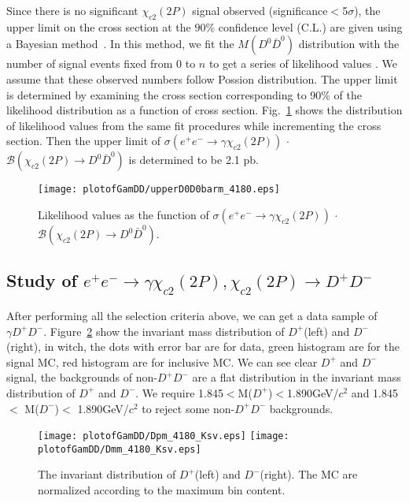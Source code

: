 \documentclass[aps,preprint,tightenlines,superscriptaddress,showpacs,byrevtex,amsmath,amssymb,nofloatfix]{revtex4}
\begin{document}
  Since there is no significant $\chi_{c2}(2P)$ signal observed (significance$<$5$\sigma$), the upper limit on the cross section at the $90\%$ confidence level (C.L.) are given using a Bayesian method~\cite{upperlimit}. In this method, we fit the $M(D^{0}\bar{D}^{0})$ distribution with the number of signal events fixed from 0 to $n$ to get a series of likelihood values . We assume that these observed numbers follow Possion distribution.  The upper limit is determined by examining the cross section corresponding to 90\% of the likelihood distribution as a function of cross section. Fig.~\ref{FitDDbar_D0_up} shows the distribution of likelihood values from the same fit procedures while incrementing the cross section. Then the upper limit of $\sigma (e^{+}e^{-}\rightarrow \gamma \chi_{c2} (2P))$ $\cdot$ $\mathcal{B}(\chi_{c2} (2P)\rightarrow  D^{0}\bar{D}^{0})$ is determined to be 2.1 pb.

\begin{figure}[!htbp]
\captionsetup{justification=raggedright}
    \texttt{[image: plotofGamDD/upperD0D0barm\_4180.eps]}

  \caption{\small Likelihood values as the function of $\sigma (e^{+}e^{-}\rightarrow \gamma \chi_{c2} (2P))$ $\cdot$ $\mathcal{B}(\chi_{c2} (2P)\rightarrow  D^{0}\bar{D}^{0})$.}
  \label{FitDDbar_D0_up}
\end{figure}



\subsection{Study of $e^{+}e^{-}\rightarrow \gamma \chi_{c2}(2P), \chi_{c2}(2P)\rightarrow D^{+}D^{-}$}

After performing all the selection criteria above, we can get a data sample of $\gamma D^{+}D^{-}$. Figure~\ref{mDpandmDm} show the invariant mass distribution of $D^{+}$(left) and $D^{-}$(right), in witch, the dots with error bar are for data, green histogram are for the signal MC, red histogram are for inclusive MC. We can see clear $D^{+}$ and $D^{-}$ signal, the backgrounds of non-$D^{+}D^{-}$ are a flat distribution in the invariant mass distribution of $D^{+}$ and $D^{-}$. We require 1.845$ <$M($D^{+}$)$<$1.890GeV/$c^{2}$ and 1.845 $<$ M($D^{-}$)$<$ 1.890GeV/$c^{2}$ to reject some non-$D^{+}D^{-}$ backgrounds.


\begin{figure}[!htbp]
\captionsetup{justification=raggedright}
    \texttt{[image: plotofGamDD/Dpm\_4180\_Ksv.eps]}
    \texttt{[image: plotofGamDD/Dmm\_4180\_Ksv.eps]}
  \caption{\small The invariant distribution of $D^{+}$(left) and $D^{-}$(right). The  MC are normalized according to the maximum bin content.}
  \label{mDpandmDm}
 \end{figure}
\end{document}

